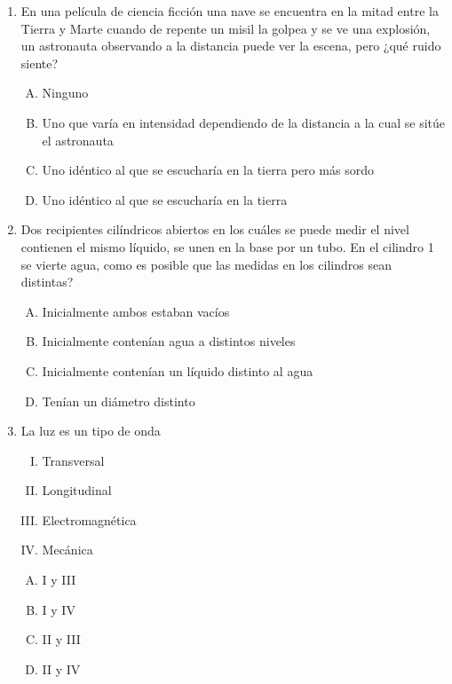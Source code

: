 \begin{enumerate}
\item En una película de ciencia ficción una nave se encuentra en la mitad entre la Tierra y Marte cuando de repente un misil la golpea y se ve una explosión, un astronauta observando a la distancia puede ver la escena, pero ¿qué ruido siente?\label{dia-23}

\begin{enumerate}[(A)]
\item Ninguno
\item Uno que varía en intensidad dependiendo de la distancia a la cual se sitúe el astronauta
\item Uno idéntico al que se escucharía en la tierra pero más sordo 
\item Uno idéntico al que se escucharía en la tierra 
\end{enumerate}

\newpage

\item Dos recipientes cilíndricos abiertos en los cuáles se puede medir el nivel contienen el mismo líquido, se unen en la base por un tubo. En el cilindro 1 se vierte agua, como es posible que las medidas en los cilindros sean distintas? \label{dia-24}

\begin{enumerate}[(A)]
\item Inicialmente ambos estaban vacíos
\item Inicialmente contenían agua a distintos niveles
\item Inicialmente contenían un líquido distinto al agua
\item Tenían un diámetro distinto 
\end{enumerate}


\newpage
\item La luz es un tipo de onda \label{dia-25}
\begin{enumerate}[I.]
\item Transversal
\item Longitudinal
\item Electromagnética
\item Mecánica
\end{enumerate}


\begin{enumerate}[(A)]
\item I y III
\item I y IV
\item II y III
\item II y IV
\end{enumerate}



\end{enumerate}


